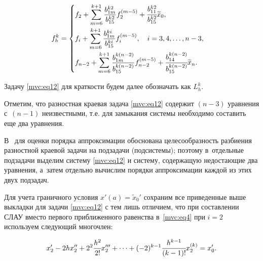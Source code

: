 \begin{equation}

\label{mvc:eq14}

   f_{h}^k=

\begin{cases}

\displaystyle f_{2}+\sum_{m=6}^{k+1}\frac{b_{1m}^{k2}}{b_{15}^{k2}} 

f_2^{(m-5)}+\cfrac{b_{11}^{k2}}{b_{15}^{k2}} \widetilde{x}_0,

\\[4mm]

\displaystyle f_{i}+\sum_{m=6}^{k+1}\frac{b_{1m}^{ki}}{b_{15}^{ki}} f_i^{(m-5)},\quad  i=3,  4,  \dots,  n-3,

\\[4mm]

\displaystyle  f_{n-2}+\sum_{m=6}^{k+1}\frac{b_{1m}^{k(n-2)}}{b_{15}^{k(n-2)}} f_{n-2}^{(m-5)}+\cfrac{b_{14}^{k(n-2)}}{b_{15}^{k(n-2)}} \widetilde{x}_n.

\end{cases}

\end{equation}

Задачу \eqref{mvc:eq12} для краткости будем далее обозначать как  $L_h^k$.







Отметим, что разностная краевая задача \eqref{mvc:eq12} содержит $   (n-3)$ уравнения с~$   (n-1)$ неизвестными, т.е. для замыкания системы необходимо составить еще два уравнения.


В~\cite{mc:bib6} для оценки порядка аппроксимации обоснована целесообразность разбиения разностной краевой задачи на подзадачи (подсистемы); поэтому в~отдельные подзадачи выделим систему \eqref{mvc:eq12} и систему, содержащую недостающие два уравнения, а~затем отдельно вычислим порядки аппроксимации каждой из этих двух подзадач.



Для учета граничного условия $x'(a)=\widetilde{x}_0'$ сохраним все приведенные выше выкладки для задачи \eqref{mvc:eq12} с тем лишь отличием, что при составлении СЛАУ вместо первого приближенного равенства в~\eqref{mvc:eq4} при $i=2$ используем следующий многочлен:

\begin{equation}

\label{mvc:eq15}

  x_2'-2 h x''_2+2^2 \cfrac{h^{2}}{2!} x_{2}'''+\dots+(-2)^{k-1}\cfrac{h^{k-1}}{{(k-1)}!} x_2^{(k)}={x}_0'.

\end{equation}



